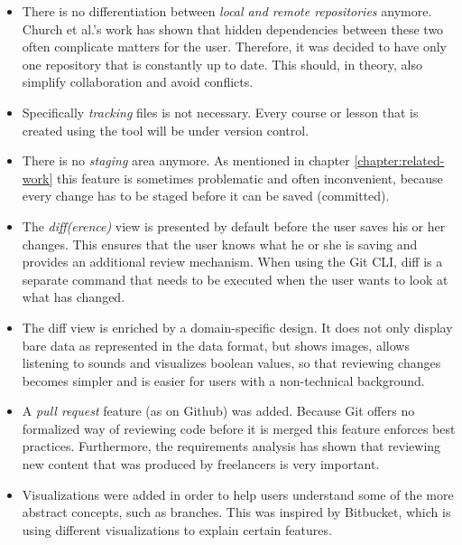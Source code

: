 \begin{itemize}
  \item There is no differentiation between \emph{local and remote repositories} anymore. Church et al.'s \cite{church_case_2014} work has shown that hidden dependencies between these two often complicate matters for the user. Therefore, it was decided to have only one repository that is constantly up to date. This should, in theory, also simplify collaboration and avoid conflicts.
  \item Specifically \emph{tracking} files is not necessary. Every course or lesson that is created using the tool will be under version control.
  \item There is no \emph{staging} area anymore. As mentioned in chapter \ref{chapter:related-work} this feature is sometimes problematic and often inconvenient, because every change has to be staged before it can be saved (committed).
  \item The \emph{diff(erence)} view is presented by default before the user saves his or her changes. This ensures that the user knows what he or she is saving and provides an additional review mechanism. When using the Git CLI, diff is a separate command that needs to be executed when the user wants to look at what has changed.
  \item The diff view is enriched by a domain-specific design. It does not only display bare data as represented in the data format, but shows images, allows listening to sounds and visualizes boolean values, so that reviewing changes becomes simpler and is easier for users with a non-technical background.
  \item A \emph{pull request} feature (as on Github) was added. Because Git offers no formalized way of reviewing code before it is merged this feature enforces best practices. Furthermore, the requirements analysis has shown that reviewing new content that was produced by freelancers is very important.
  \item Visualizations were added in order to help users understand some of the more abstract concepts, such as branches. This was inspired by Bitbucket, which is using different visualizations to explain certain features.
\end{itemize}

